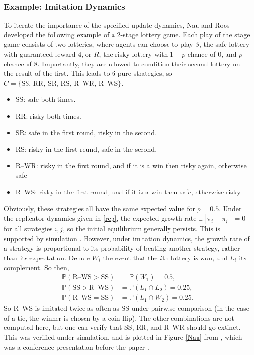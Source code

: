 \subsubsection{Example: Imitation Dynamics} \label{Lottery}
To iterate the importance of the specified update dynamics, Nau and Roos \cite{RN30} developed the following example of a 2-stage lottery game. Each play of the stage game consists of two lotteries, where agents can choose to play $S$, the safe lottery with guaranteed reward $4$, or $R$, the risky lottery with $1-p$ chance of $0$, and $p$ chance of $8$. Importantly, they are allowed to condition their second lottery on the result of the first. This leads to 6 pure strategies, so $C = \{\textrm{SS, RR, SR, RS, R--WR, R--WS} \}$. 
\begin{itemize}
    \item SS: safe both times. 
    \item RR: risky both times. 
    \item SR: safe in the first round, risky in the second. 
    \item RS: risky in the first round, safe in the second.
    \item R--WR: risky in the first round, and if it is a win then risky again, otherwise safe.
    \item R--WS: risky in the first round, and if it is a win then safe, otherwise risky.
\end{itemize}
Obviously, these strategies all have the same expected value for $p=0.5$. Under the replicator dynamics given in \eqref{rep}, the expected growth rate $\mathbb E[\pi_i - \pi_j] = 0$ for all strategies $i,j$, so the initial equilibrium generally persists. This is supported by simulation \cite{RN30}. However, under imitation dynamics, the growth rate of a strategy is proportional to its probability of beating another strategy, rather than its expectation. Denote $W_i$ the event that the $i$th lottery is won, and $L_i$ its complement. So then,
\begin{align*}
    \mathbb P(\textrm{R--WS}> \textrm{SS}) &= \mathbb P(W_1) = 0.5, \\
    \mathbb P(\textrm{SS}>\textrm{R--WS}) &= \mathbb P(L_1 \cap L_2) = 0.25, \\
    \mathbb P(\textrm{R--WS} = \textrm{SS}) &= \mathbb P(L_1 \cap W_2) = 0.25.
\end{align*}
So R--WS is imitated twice as often as SS under pairwise comparison (in the case of a tie, the winner is chosen by a coin flip). The other combinations are not computed here, but one can verify that SS, RR, and R--WR should go extinct. This was verified under simulation, and is plotted in Figure \ref{Nau} from \cite{RN24}, which was a conference presentation before the paper \cite{RN30}. 
\FloatBarrier
{} 
\FloatBarrier

